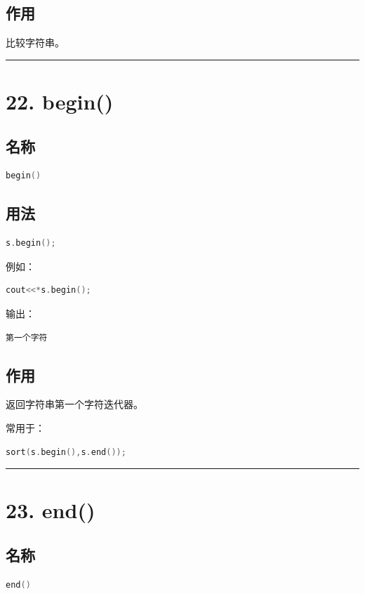 \documentclass[10pt,twocolumn]{extarticle}
\begin{document}
\subsection{作用}
比较字符串。

\noindent\rule{\linewidth}{0.4pt}

\section{22. begin()}

\subsection{名称}
\begin{lstlisting}[language=C++]
begin()
\end{lstlisting}

\subsection{用法}
\begin{lstlisting}[language=C++]
s.begin();
\end{lstlisting}
例如：
\begin{lstlisting}[language=C++]
cout<<*s.begin();
\end{lstlisting}
输出：
\begin{lstlisting}
第一个字符
\end{lstlisting}

\subsection{作用}
返回字符串第一个字符迭代器。

常用于：
\begin{lstlisting}[language=C++]
sort(s.begin(),s.end());
\end{lstlisting}

\noindent\rule{\linewidth}{0.4pt}

\section{23. end()}

\subsection{名称}
\begin{lstlisting}[language=C++]
end()
\end{lstlisting}
\end{document}
